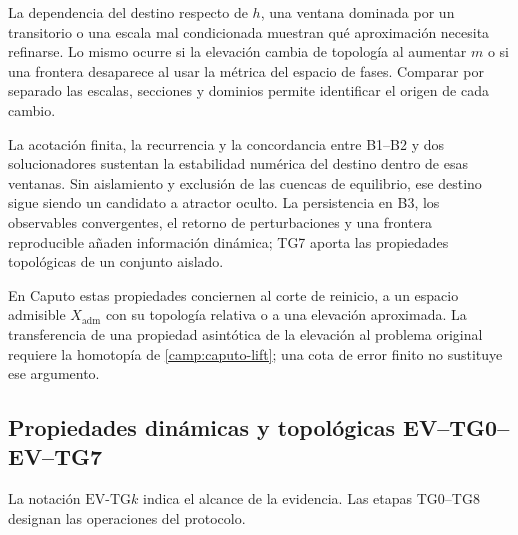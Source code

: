 La dependencia del destino respecto de \(h\), una ventana dominada por un
transitorio o una escala mal condicionada muestran qué aproximación necesita
refinarse. Lo mismo ocurre si la elevación cambia de topología al aumentar
\(m\) o si una frontera desaparece al usar la métrica del espacio de fases.
Comparar por separado las escalas, secciones y dominios permite identificar
el origen de cada cambio.

La acotación finita, la recurrencia y la concordancia entre B1--B2 y dos
solucionadores sustentan la estabilidad numérica del destino dentro de esas
ventanas. Sin aislamiento y exclusión de las cuencas de equilibrio, ese
destino sigue siendo un candidato a atractor oculto. La persistencia en B3,
los observables convergentes, el retorno de perturbaciones y una frontera
reproducible añaden información dinámica; TG7 aporta las propiedades
topológicas de un conjunto aislado.

En Caputo estas propiedades conciernen al corte de reinicio, a un espacio
admisible \(X_{\mathrm{adm}}\) con su topología relativa o a una elevación
aproximada. La transferencia de una propiedad asintótica de la elevación al
problema original requiere la homotopía de \cref{camp:caputo-lift}; una cota
de error finito no sustituye ese argumento.

\subsection{Propiedades dinámicas y topológicas EV--TG0--EV--TG7}
\label{camp:evidence-levels}

La notación \(\mathrm{EV}\text{-}\mathrm{TG}k\) indica el alcance de la
evidencia. Las etapas TG0--TG8 designan las operaciones del protocolo.

